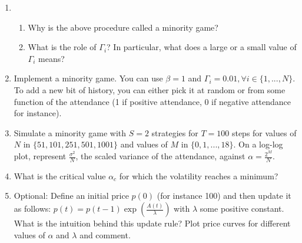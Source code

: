 \begin{enumerate}
    \item 
        \begin{enumerate}
            \item Why is the above procedure called a minority game?
            \item What is the role of $\Gamma_i$? In particular, what does a large or a small value of $\Gamma_i$ means? 
        \end{enumerate}
    \item Implement a minority game. You can use $\beta = 1$ and $\Gamma_i = 0.01, \forall i \in \{1,...,N\}$. To add a new bit of history, you can either pick it at random or from some function of the attendance (1 if positive attendance, 0 if negative attendance for instance).
    \item Simulate a minority game with $S = 2$ strategies for $T = 100$ steps for values of $N$ in $\{51, 101, 251, 501, 1001\}$ and values of $M$ in $\{0, 1, ..., 18\}$. On a log-log plot, represent $\frac{\sigma^2}{N}$, the scaled variance of the attendance, against $\alpha = \frac{2^M}{N}$.
    \item What is the critical value $\alpha_c$ for which the volatility reaches a minimum?
    \item Optional: Define an initial price $p(0)$ (for instance 100) and then update it as follows: $p(t) = p(t - 1)\exp(\frac{A(t)}{\lambda})$ with $\lambda$ some positive constant. What is the intuition behind this update rule? Plot price curves for different values of $\alpha$ and $\lambda$ and comment.
\end{enumerate}



